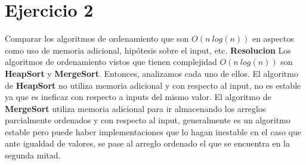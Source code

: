 \documentclass[10pt,a4paper]{article}
\begin{document}
\section{Ejercicio 2}

Comparar los algoritmos de ordenamiento que son $O(n~log(n))$ en aspectos como uso de memoria adicional, hipótesis sobre el input, etc.
\newline
\newline
\textbf{Resolucion}
\newline
\newline
Los algoritmos de ordenamiento vistos que tienen complejidad $O(n~log(n))$ son \textbf{HeapSort} y \textbf{MergeSort}. Entonces, analizamos cada uno de ellos.
\newline
\newline
El algoritmo de \textbf{HeapSort} no utiliza memoria adicional y con respecto al input, no es estable ya que es ineficaz con respecto a inputs del mismo valor.  
\newline
\newline
El algoritmo de \textbf{MergeSort} utiliza memoria adicional para ir almacenando los arreglos parcialmente ordenados y con respecto al input, generalmente es un algoritmo estable pero puede haber implementaciones que lo hagan inestable en el caso que ante igualdad de valores, se pase al arreglo ordenado el que se encuentra en la segunda mitad.  



\newpage
\end{document}
